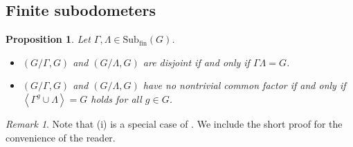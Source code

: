 \documentclass[12pt, reqno]{amsart}
\newtheorem{proposition}[theorem]{Proposition}
\theoremstyle{definition}
\theoremstyle{remark}
\newtheorem{remark}[theorem]{Remark}
\numberwithin{equation}{section}
\theoremstyle{theorem}
\theoremstyle{remark}
\newcommand{\grouphull}[1]{\left\langle #1 \right\rangle}
\def\subfin{{\operatorname{Sub_{fin}}}}
\begin{document}
\subsection{Finite subodometers}
\label{subsec:DisjointnessOfSubodometers_FiniteSubodometers}

\begin{proposition}
\label{pro:disjointnessNoCommonFactorsFiniteSubodometers}
    Let $\Gamma,\Lambda\in \subfin(G)$. 
    \begin{itemize}
        \item[(i)] 
        $(G/\Gamma,G)$ and $(G/\Lambda,G)$ are disjoint if and only if $\Gamma\Lambda=G$. 
        \item[(ii)] 
        $(G/\Gamma,G)$ and $(G/\Lambda,G)$ have no nontrivial common factor if and only if $\grouphull{\Gamma^g\cup \Lambda}=G$ holds for all $g\in G$. 
    \end{itemize}
\end{proposition}
\begin{remark}
    Note that (i) is a special case of \cite[Theorem~11.12]{auslander1988minimal}. We include the short proof for the convenience of the reader. 
\end{remark}
\end{document}
